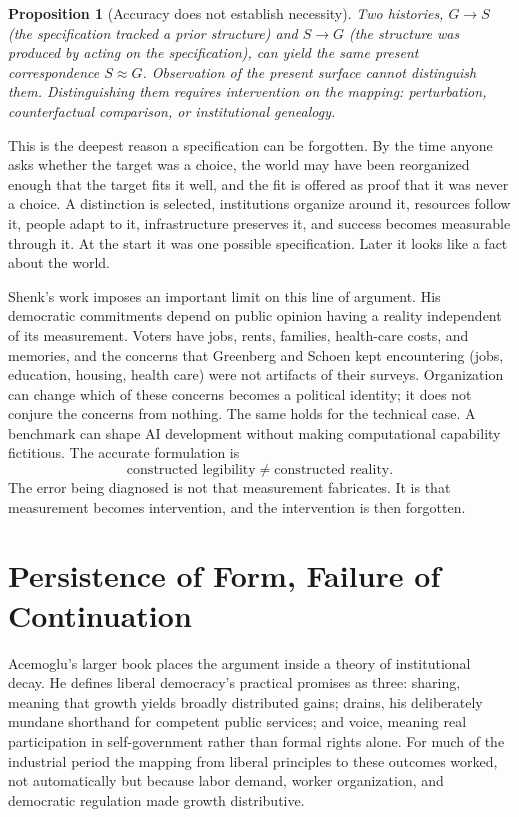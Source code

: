 \documentclass[11pt]{article}
\newtheorem{proposition}{Proposition}
\begin{document}
\begin{proposition}[Accuracy does not establish necessity]
Two histories, $G \to S$ (the specification tracked a prior structure) and $S \to G$ (the structure was produced by acting on the specification), can yield the same present correspondence $S \approx G$. Observation of the present surface cannot distinguish them. Distinguishing them requires intervention on the mapping: perturbation, counterfactual comparison, or institutional genealogy.
\end{proposition}

This is the deepest reason a specification can be forgotten. By the time anyone asks whether the target was a choice, the world may have been reorganized enough that the target fits it well, and the fit is offered as proof that it was never a choice. A distinction is selected, institutions organize around it, resources follow it, people adapt to it, infrastructure preserves it, and success becomes measurable through it. At the start it was one possible specification. Later it looks like a fact about the world.

Shenk's work imposes an important limit on this line of argument. His democratic commitments depend on public opinion having a reality independent of its measurement. Voters have jobs, rents, families, health-care costs, and memories, and the concerns that Greenberg and Schoen kept encountering (jobs, education, housing, health care) were not artifacts of their surveys. Organization can change which of these concerns becomes a political identity; it does not conjure the concerns from nothing. The same holds for the technical case. A benchmark can shape AI development without making computational capability fictitious. The accurate formulation is
\[
\text{constructed legibility} \neq \text{constructed reality}.
\]
The error being diagnosed is not that measurement fabricates. It is that measurement becomes intervention, and the intervention is then forgotten.

\section{Persistence of Form, Failure of Continuation}

Acemoglu's larger book places the argument inside a theory of institutional decay. He defines liberal democracy's practical promises as three: sharing, meaning that growth yields broadly distributed gains; drains, his deliberately mundane shorthand for competent public services; and voice, meaning real participation in self-government rather than formal rights alone. For much of the industrial period the mapping from liberal principles to these outcomes worked, not automatically but because labor demand, worker organization, and democratic regulation made growth distributive.
\end{document}
